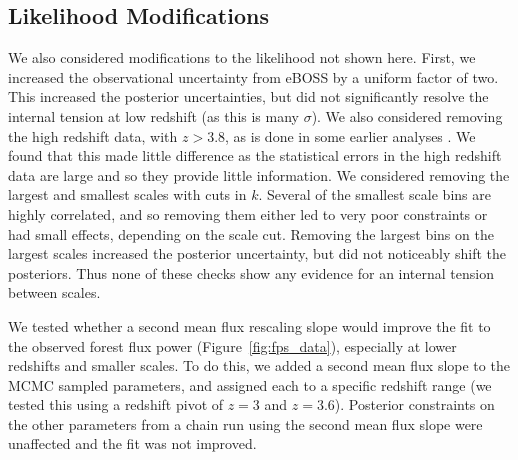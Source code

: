 \subsection{Likelihood Modifications}
\label{sec:altlikelihood}

We also considered modifications to the likelihood not shown here.
First, we increased the observational uncertainty from eBOSS by a uniform factor of two.
This increased the posterior uncertainties, but did not significantly resolve the internal tension at low redshift (as this is many $\sigma$).
We also considered removing the high redshift data, with $z > 3.8$, as is done in some earlier analyses \cite{2011MNRAS.413.1717B}.
We found that this made little difference as the statistical errors in the high redshift data are large and so they provide little information. 
We considered removing the largest and smallest scales with cuts in $k$.
Several of the smallest scale bins are highly correlated, and so removing them either led to very poor constraints or had small effects, depending on the scale cut.
Removing the largest bins on the largest scales increased the posterior uncertainty, but did not noticeably shift the posteriors.
Thus none of these checks show any evidence for an internal tension between scales.

We tested whether a second mean flux rescaling slope would improve the fit to the observed \lya forest flux power (Figure~\ref{fig:fps_data}), especially at lower redshifts and smaller scales.
To do this, we added a second mean flux slope to the MCMC sampled parameters, and assigned each to a specific redshift range (we tested this using a redshift pivot of $z=3$ and $z=3.6$).
Posterior constraints on the other parameters from a chain run using the second mean flux slope were unaffected and the fit was not improved.
